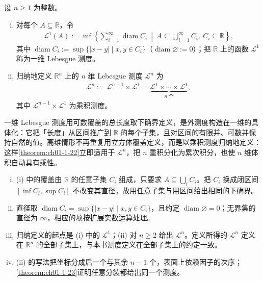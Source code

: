 \documentclass[../../main.tex]{subfiles}%
\begin{document}
\begin{definition}[Lebesgue 测度]\label{definition:ch01-1-18}
设 $n\geqslant1$ 为整数。
\begin{enumerate}[(i)]
\item 对每个 $A\subseteq\mathbb{R}$，令
\begin{align*}
\mathcal{L}^1(A):=\inf\left\{\sum_{i=1}^{\infty}\operatorname{diam}C_i\ \middle|\ A\subseteq\bigcup_{i=1}^{\infty}C_i,\ C_i\subseteq\mathbb{R}\right\},
\end{align*}
其中 $\operatorname{diam}C_i:=\sup\{\lvert x-y\rvert\mid x,y\in C_i\}$（$\operatorname{diam}\varnothing:=0$）；把 $\mathbb{R}$ 上的函数 $\mathcal{L}^1$ 称为一维 Lebesgue 测度。
\item 归纳地定义 $\mathbb{R}^n$ 上的 $n$ 维 Lebesgue 测度 $\mathcal{L}^n$ 为
\begin{align*}
\mathcal{L}^n:=\mathcal{L}^{n-1}\times\mathcal{L}^1=\underbrace{\mathcal{L}^1\times\cdots\times\mathcal{L}^1}_{n\ \text{个}},
\end{align*}
其中 $\mathcal{L}^{n-1}\times\mathcal{L}^1$ 为乘积测度。
\end{enumerate}
\end{definition}

\begin{remark}\label{remark:ch01-def-1-18-动机}
一维 Lebesgue 测度用可数覆盖的总长度取下确界定义，是外测度构造在一维的具体化：它把「长度」从区间推广到 $\mathbb{R}$ 的每个子集，且对区间的有限并、可数并保持自然的值。高维情形不再重复用立方体覆盖定义，而是以乘积测度归纳地定义：这样\cref{theorem:ch01-1-22}立即适用于 $\mathcal{L}^n$，把 $n$ 重积分化为累次积分，也使 $n$ 维体积自动具有乘性。%
\end{remark}

\begin{remark}\label{remark:ch01-def-1-18-条件}
\begin{enumerate}[(i)]
\item (i) 中的覆盖由 $\mathbb{R}$ 的任意子集 $C_i$ 组成，只要求 $A\subseteq\bigcup_iC_i$。把 $C_i$ 换成闭区间 $[\inf C_i,\sup C_i]$ 不改变其直径，故用任意子集与用区间给出相同的下确界。
\item 直径取 $\operatorname{diam}C_i=\sup\{\lvert x-y\rvert\mid x,y\in C_i\}$，且约定 $\operatorname{diam}\varnothing=0$；无界集的直径为 $\infty$，相应的项按扩展实数运算处理。
\item 归纳定义的起点是 (i) 中的 $\mathcal{L}^1$；(ii) 对 $n\geqslant2$ 给出 $\mathcal{L}^n$。定义所得的 $\mathcal{L}^n$ 定义在 $\mathbb{R}^n$ 的全部子集上，与本书测度定义在全部子集上的约定一致。
\item (ii) 的写法把坐标分成后一个与其余 $n-1$ 个，表面上依赖因子的次序；\cref{theorem:ch01-1-23}证明任意分裂都给出同一个测度。%
\end{enumerate}
\end{remark}
\end{document}
